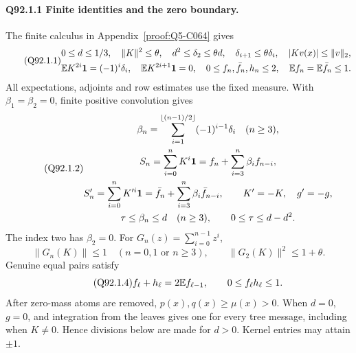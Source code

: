 \paragraph{Q92.1.1 Finite identities and the zero boundary.}
The finite calculus in Appendix~\ref{proof:Q5-C064} gives
\begin{equation}\tag{Q92.1.1}\label{eq:Q92:1.1}
\begin{gathered}
0\le d\le1/3,\quad\|K\|^2\le\theta,\quad
d^2\le\delta_2\le\theta d,\quad\delta_{i+1}\le\theta\delta_i,
\quad|Kv(x)|\le\|v\|_2,\\
\mathbb E K^{2i}\mathbf1=(-1)^i\delta_i,\quad\mathbb E K^{2i+1}\mathbf1=0,\quad
0\le f_n,\bar f_n,h_n\le2,\quad\mathbb E f_n=\mathbb E\bar f_n\le1.
\end{gathered}
\end{equation}
All expectations, adjoints and row estimates use the fixed measure.
With \(\beta_1=\allowbreak \beta_2=\allowbreak 0\), finite positive convolution gives
\begin{equation}\tag{Q92.1.2}\label{eq:Q92:1.2}
\begin{gathered}
\beta_n=\sum_{i=1}^{\lfloor(n-1)/2\rfloor}(-1)^{i-1}\delta_i
\quad(n\ge3),\\
S_n=\sum_{i=0}^nK^i\mathbf1
=f_n+\sum_{i=3}^n\beta_i f_{n-i},\\
S'_n=\sum_{i=0}^nK'^i\mathbf1
=\bar f_n+\sum_{i=3}^n\beta_i\bar f_{n-i},\qquad K'=-K,\quad g'=-g,\\
\tau\le\beta_n\le d\quad(n\ge3),\qquad0\le\tau\le d-d^2.
\end{gathered}
\end{equation}
The index two has \(\beta_2=\allowbreak 0\). For \(G_n(z)=\allowbreak \sum_{i=\allowbreak 0}^{n-1}z^i\),
\begin{equation}\tag{Q92.1.3}\label{eq:Q92:1.3}
\|G_n(K)\|\le1\quad(n=0,1\text{ or }n\ge3),\qquad
\|G_2(K)\|^2\le1+\theta.
\end{equation}
Genuine equal pairs satisfy
\begin{equation}\tag{Q92.1.4}\label{eq:Q92:1.4}
f_\ell+h_\ell=2\mathbb E f_{\ell-1},\qquad0\le f_\ell h_\ell\le1.
\end{equation}
After zero-mass atoms are removed, \(p(x),\allowbreak q(x)\ge\allowbreak \mu(x)>\allowbreak 0\).
When \(d=\allowbreak 0\), \(g=\allowbreak 0\), and integration from the leaves gives one for
every tree message, including when \(K\ne0\). Hence divisions below
are made for \(d>\allowbreak 0\). Kernel entries may attain \(\pm1\).

